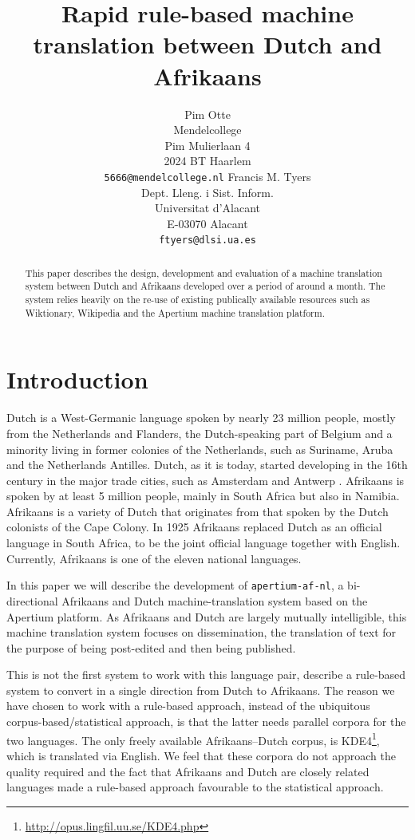 \documentclass[11pt]{article}
\title{Rapid rule-based machine translation between Dutch and Afrikaans}
\author{Pim Otte\\
  Mendelcollege\\
  Pim Mulierlaan 4\\
  2024 BT Haarlem\\
  {\tt 5666@mendelcollege.nl}  \And
  Francis M. Tyers\\
  Dept. Lleng. i Sist. Inform.\\
  Universitat d'Alacant\\
  E-03070 Alacant \\
  {\tt ftyers@dlsi.ua.es}}
\date{}
\begin{document}
\maketitle
\begin{abstract}
 This paper describes the design, development and evaluation of a machine
 translation system between Dutch and Afrikaans developed over a period of
 around a month. The system relies heavily on the re-use of existing 
 publically available resources such as Wiktionary, Wikipedia and the 
 Apertium machine translation platform.
\end{abstract}

\section{Introduction}

Dutch is a West-Germanic language spoken by nearly 23 million people, 
mostly from the Netherlands and Flanders, the Dutch-speaking part of Belgium and a minority 
living in former colonies of the Netherlands, such as Suriname, Aruba and the Netherlands 
Antilles. Dutch, as it is today, started developing in the 16th century in the 
major trade cities, such as Amsterdam and Antwerp \cite{Shetter:02}.  Afrikaans is spoken 
by at least 5 million people, mainly in South Africa but also in Namibia. Afrikaans is a 
variety of Dutch that originates from that spoken by the Dutch colonists of 
the Cape Colony. In 1925 Afrikaans replaced Dutch as an official language in South Africa, to 
be the joint official language together with English. \cite{Donaldson:93} Currently, Afrikaans is one of the 
eleven national languages. 

In this paper we will describe the development of {\small {\tt apertium-af-nl}}, a bi-directional Afrikaans 
and Dutch machine-translation system based on the Apertium platform. As Afrikaans and Dutch 
are largely mutually intelligible, this machine translation system focuses on dissemination, the 
translation of text for the purpose of being post-edited and then being published. 

This is not the first system to work with this language pair,  describe
a rule-based system to convert in a single direction from Dutch to Afrikaans. 
The reason we have chosen to work with a rule-based approach, instead of the ubiquitous 
corpus-based/statistical approach, is that the latter needs parallel corpora for the two 
languages. The only freely available Afrikaans--Dutch corpus, is 
KDE4\footnote{\url{http://opus.lingfil.uu.se/KDE4.php}}, which is translated via English. We 
feel that these corpora do not approach the quality required and the fact that Afrikaans 
and Dutch are closely related languages made a rule-based approach favourable to the 
statistical approach.
\end{document}
